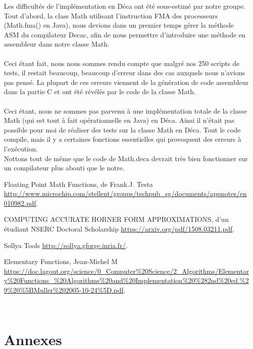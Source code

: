 \documentclass[12pt]{article}
\begin{document}
Les difficultés de l'implémentation en Déca ont été sous-estimé par notre groupe. Tout d'abord, la class Math utilisant l'instruction
FMA des processeurs (Math.fma() en Java), nous devions dans un premier temps gérer la méthode ASM du compilateur Decac, afin de nous
permettre d'introduire une méthode en assembleur dans notre classe Math.\\
\\
Ceci étant fait, nous nous sommes rendu compte que malgré nos 250 scripts de tests, il restait beaucoup, beaucoup d'erreur dans des cas
auxquels nous n'avions pas pensé. La plupart de ces erreurs viennent de la génération de code assembleur dans la partie C et ont été
révélés par le code de la classe Math.\\
\\
Ceci étant, nous ne sommes pas parvenu à une implémentation totale de la classe Math (qui est tout à fait opérationnelle en Java) en Déca.
Ainsi il n'était pas possible pour moi de réaliser des tests sur la classe Math en Déca.
Tout le code compile, mais il y a certaines fonctions essentielles qui provoquent des erreurs à l'exécution.\\
Nottons tout de même que le code de Math.deca devrait très bien fonctionner sur un compilateur plus abouti que le notre.

\begin{thebibliography}{5}

Floating Point Math Functions, de Frank.J. Testa \url{http://www.microchip.com/stellent/groups/techpub_sg/documents/appnotes/en010982.pdf}.

COMPUTING ACCURATE HORNER FORM APPROXIMATIONS, d'un étudiant NSERC Doctoral Scholarship \url{https://arxiv.org/pdf/1508.03211.pdf}.

Sollya Tools \url{http://sollya.gforge.inria.fr/}.

Elementary Functions, Jean-Michel M \url{https://doc.lagout.org/science/0_Computer%20Science/2_Algorithms/Elementary%20Functions_%20Algorithms%20and%20Implementation%20%282nd%20ed.%29%20%5BMuller%202005-10-24%5D.pdf}.
\end{thebibliography}
\\

\newpage
\section{Annexes}
\label{sec:annexes}
\end{document}
